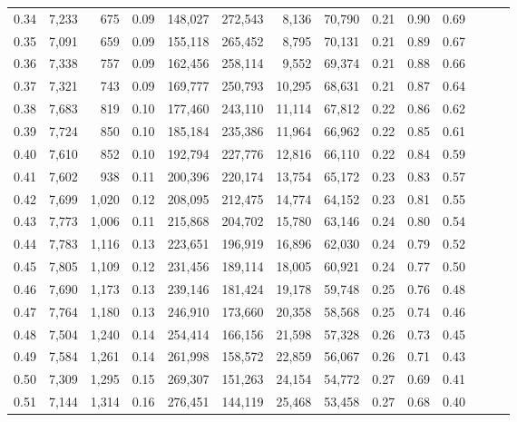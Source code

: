 \begin{tabular}{rrrrrrrrrrrrrr}
0.34 &   7,233 &    675 &  0.09 &  148,027 &  272,543 &   8,136 &  70,790 &  0.21 &  0.90 &      0.69 \\
0.35 &   7,091 &    659 &  0.09 &  155,118 &  265,452 &   8,795 &  70,131 &  0.21 &  0.89 &      0.67 \\
0.36 &   7,338 &    757 &  0.09 &  162,456 &  258,114 &   9,552 &  69,374 &  0.21 &  0.88 &      0.66 \\
0.37 &   7,321 &    743 &  0.09 &  169,777 &  250,793 &  10,295 &  68,631 &  0.21 &  0.87 &      0.64 \\
0.38 &   7,683 &    819 &  0.10 &  177,460 &  243,110 &  11,114 &  67,812 &  0.22 &  0.86 &      0.62 \\
0.39 &   7,724 &    850 &  0.10 &  185,184 &  235,386 &  11,964 &  66,962 &  0.22 &  0.85 &      0.61 \\
0.40 &   7,610 &    852 &  0.10 &  192,794 &  227,776 &  12,816 &  66,110 &  0.22 &  0.84 &      0.59 \\
0.41 &   7,602 &    938 &  0.11 &  200,396 &  220,174 &  13,754 &  65,172 &  0.23 &  0.83 &      0.57 \\
0.42 &   7,699 &  1,020 &  0.12 &  208,095 &  212,475 &  14,774 &  64,152 &  0.23 &  0.81 &      0.55 \\
0.43 &   7,773 &  1,006 &  0.11 &  215,868 &  204,702 &  15,780 &  63,146 &  0.24 &  0.80 &      0.54 \\
0.44 &   7,783 &  1,116 &  0.13 &  223,651 &  196,919 &  16,896 &  62,030 &  0.24 &  0.79 &      0.52 \\
0.45 &   7,805 &  1,109 &  0.12 &  231,456 &  189,114 &  18,005 &  60,921 &  0.24 &  0.77 &      0.50 \\
0.46 &   7,690 &  1,173 &  0.13 &  239,146 &  181,424 &  19,178 &  59,748 &  0.25 &  0.76 &      0.48 \\
0.47 &   7,764 &  1,180 &  0.13 &  246,910 &  173,660 &  20,358 &  58,568 &  0.25 &  0.74 &      0.46 \\
0.48 &   7,504 &  1,240 &  0.14 &  254,414 &  166,156 &  21,598 &  57,328 &  0.26 &  0.73 &      0.45 \\
0.49 &   7,584 &  1,261 &  0.14 &  261,998 &  158,572 &  22,859 &  56,067 &  0.26 &  0.71 &      0.43 \\
0.50 &   7,309 &  1,295 &  0.15 &  269,307 &  151,263 &  24,154 &  54,772 &  0.27 &  0.69 &      0.41 \\
0.51 &   7,144 &  1,314 &  0.16 &  276,451 &  144,119 &  25,468 &  53,458 &  0.27 &  0.68 &      0.40 \\

\end{tabular}
